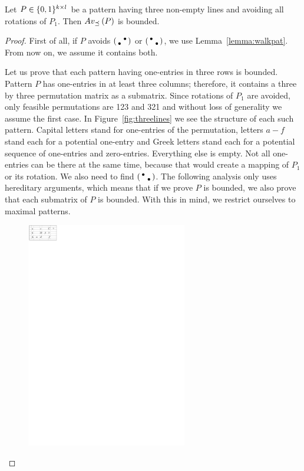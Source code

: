 \begin{lemma}
Let $P\in\{0,1\}^{k\times l}$ be a pattern having three non-empty lines and avoiding all rotations of $P_1$. Then $Av_{\preceq}\left(P\right)$ is bounded.
\end{lemma}
\begin{proof}
First of all, if $P$ avoids $\left(\begin{smallmatrix} &\bullet\\\bullet& \end{smallmatrix}\right)$ or $\left(\begin{smallmatrix}\bullet& \\ &\bullet\end{smallmatrix}\right)$, we use Lemma~\ref{lemma:walkpat}. From now on, we assume it contains both.

Let us prove that each pattern having one-entries in three rows is bounded. Pattern $P$ has one-entries in at least three columns; therefore, it contains a three by three permutation matrix as a submatrix. Since rotations of $P_1$ are avoided, only feasible permutations are 123 and 321 and without loss of generality we assume the first case. In Figure~\ref{fig:threelines} we see the structure of each such pattern. Capital letters stand for one-entries of the permutation, letters $a-f$ stand each for a potential one-entry and Greek letters stand each for a potential sequence of one-entries and zero-entries. Everything else is empty. Not all one-entries can be there at the same time, because that would create a mapping of $P_1$ or its rotation. We also need to find $\left(\begin{smallmatrix}\bullet& \\ &\bullet\end{smallmatrix}\right)$. The following analysis only uses hereditary arguments, which means that if we prove $P$ is bounded, we also prove that each submatrix of $P$ is bounded. With this in mind, we restrict ourselves to maximal patterns.
\begin{figure}[!ht]
	\centering
	\includegraphics[width=70mm]{img/threelines.pdf}

\end{figure}
\end{proof}
